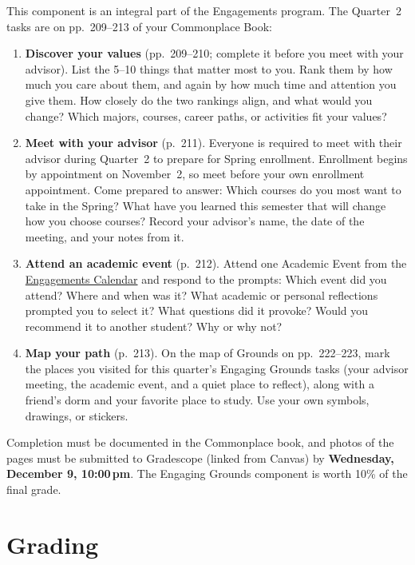 \documentclass[oneside,11pt]{amsart}
\begin{document}
This component is an integral part of the Engagements program.
The Quarter~2 tasks are on pp.~209--213 of your Commonplace Book:
\begin{enumerate}
\item \textbf{Discover your values} (pp.~209--210; complete it before you meet
with your advisor). List the 5--10 things that matter most to you. Rank them
by how much you care about them, and again by how much time and attention
you give them. How closely do the two rankings align, and what would you
change? Which majors, courses, career paths, or activities fit your values?

\item \textbf{Meet with your advisor} (p.~211). Everyone is required to meet
with their advisor during Quarter~2 to prepare for Spring enrollment.
Enrollment begins by appointment on \mbox{November~2}, so meet before your own
enrollment appointment. Come prepared to answer: Which courses do you most
want to take in the Spring? What have you learned this semester that will
change how you choose courses? Record your advisor's name, the date of the
meeting, and your notes from it.

\item \textbf{Attend an academic event} (p.~212). Attend one Academic Event
from the
\href{https://engagements.as.virginia.edu/engaging-grounds}{Engagements
Calendar} and respond to the prompts: Which event did you attend? Where and
when was it? What academic or personal reflections prompted you to select
it? What questions did it provoke? Would you recommend it to another
student? Why or why not?

\item \textbf{Map your path} (p.~213). On the map of Grounds on
pp.~222--223, mark the places you visited for this quarter's Engaging
Grounds tasks (your advisor meeting, the academic event, and a quiet place
to reflect), along with a friend's dorm and your favorite place to study.
Use your own symbols, drawings, or stickers.
\end{enumerate}
Completion must be documented in the Commonplace book, and photos of the
pages must be submitted to Gradescope (linked from Canvas) by
\textbf{Wednesday, December 9, 10:00\,pm}.
The Engaging Grounds component is worth 10\% of the final grade.

\section{Grading}
\end{document}
